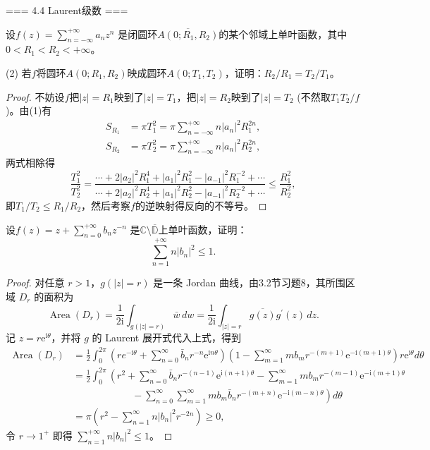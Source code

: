=== 4.4 Laurent级数 ===
\begin{7}
    设$f(z)=\sum\limits_{n=-\infty}^{+\infty}a_nz^n$
    是闭圆环$\overline{A(0;R_1,R_2)}$的某个邻域上单叶函数，其中$0<R_1<R_2<+\infty$。

    (2) 若$f$将圆环$A(0;R_1,R_2)$映成圆环$A(0;T_1,T_2)$，证明：$R_2/R_1=T_2/T_1$。
\end{7}
\begin{proof}
    不妨设$f$把$|z|=R_1$映到了$|z|=T_1$，把$|z|=R_2$映到了$|z|=T_2$ (不然取$T_1T_2/f$)。由(1)有
    \begin{align*}
        S_{R_1}&=\pi T_1^2=\pi\sum_{n=-\infty}^{+\infty}n|a_n|^2R_1^{2n},\\
        S_{R_2}&=\pi T_2^2=\pi\sum_{n=-\infty}^{+\infty}n|a_n|^2R_2^{2n},
    \end{align*}
    两式相除得
    \[\frac{T_1^2}{T_2^2}=\frac{\cdots+2|a_2|^2R_1^4+|a_1|^2R_1^2-|a_{-1}|^2R_1^{-2}+\cdots}
    {\cdots+2|a_2|^2R_2^4+|a_1|^2R_2^2-|a_{-1}|^2R_2^{-2}+\cdots}\le\frac{R_1^2}{R_2^2},\]
    即$T_1/T_2 \le R_1/R_2$，然后考察$f$的逆映射得反向的不等号。
\end{proof}
\begin{8}
    设$f(z)=z+\sum\limits_{n=0}^{+\infty}b_nz^{-n}$
    是$\mathbb{C}\setminus\overline{\mathbb{D}}$上单叶函数，证明：
    \[\sum_{n=1}^{+\infty}n|b_n|^2\le1.\]
\end{8}
\begin{proof}
    对任意 $r>1$，$g(|z|=r)$ 是一条 Jordan 曲线，由3.2节习题8，其所围区域 $D_r$ 的面积为
    $$\operatorname{Area}(D_r)=\frac{1}{2 \mathrm{i}} \int_{g(|z|=r)} \bar{w}\,dw
    =\frac{1}{2\mathrm{i}} \int_{|z|=r} \overline{g(z)} g^{\prime}(z)\,dz.$$
    记 $z=r\mathrm{e}^{\mathrm{i}\theta}$，并将 $g$ 的 Laurent 展开式代入上式，得到
    \begin{align*}
        \operatorname{Area}(D_r) &= \frac{1}{2} \int_0^{2 \pi}\left(r e^{-\mathrm{i} \theta}+\sum_{n=0}^{\infty} \bar{b}_n r^{-n} \mathrm{e}^{\mathrm{i} n \theta}\right)\left(1-\sum_{m=1}^{\infty} m b_m r^{-(m+1)} \mathrm{e}^{-\mathrm{i}(m+1) \theta}\right) r \mathrm{e}^{\mathrm{i} \theta} d\theta \\
        & = \frac{1}{2} \int_0^{2 \pi}\left(r^2+\sum_{n=0}^{\infty} \bar{b}_n r^{-(n-1)} \mathrm{e}^{\mathrm{i}(n+1) \theta}-\sum_{m=1}^{\infty} m b_m r^{-(m-1)} \mathrm{e}^{-\mathrm{i}(m+1) \theta}\right. \\
        & \left.\qquad\qquad\qquad-\sum_{n=0}^{\infty} \sum_{m=1}^{\infty} m b_m \bar{b}_n r^{-(m+n)} \mathrm{e}^{-\mathrm{i}(m-n) \theta}\right) d\theta \\
        & = \pi\left(r^2-\sum_{n=1}^{\infty} n|b_n|^2 r^{-2n}\right) \geq 0,
    \end{align*}
    令 $r \rightarrow 1^+$ 即得 $\sum\limits_{n=1}^{+\infty} n|b_n|^2 \leq 1$。
\end{proof}

